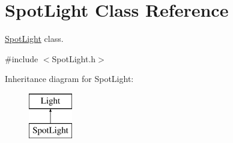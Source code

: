 \hypertarget{class_spot_light}{}\section{Spot\+Light Class Reference}
\label{class_spot_light}


\hyperlink{class_spot_light}{Spot\+Light} class.  




{\ttfamily \#include $<$Spot\+Light.\+h$>$}

Inheritance diagram for Spot\+Light\+:\begin{figure}[H]
\begin{center}
\leavevmode
\includegraphics[height=2.000000cm]{class_spot_light}
\end{center}
\end{figure}
